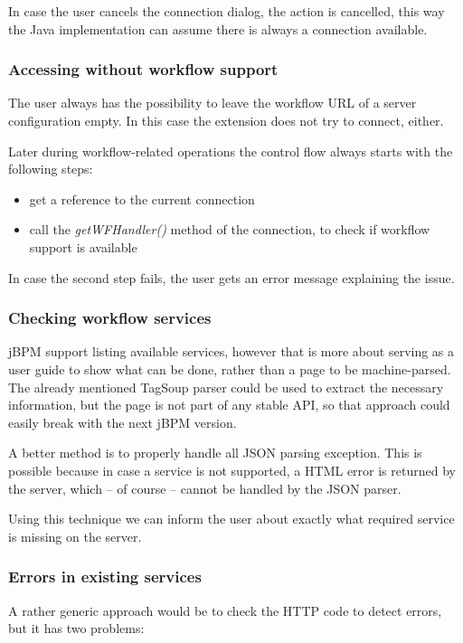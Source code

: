 In case the user cancels the connection dialog, the action is cancelled, this
way the Java implementation can assume there is always a connection available.

\subsubsection*{Accessing without workflow support}

The user always has the possibility to leave the workflow URL of a server
configuration empty. In this case the extension does not try to connect,
either.

Later during workflow-related operations the control flow always starts with the following steps:

\begin{itemize}
\item get a reference to the current connection
\item call the \emph{getWFHandler()} method of the connection, to check if workflow support is available
\end{itemize}

In case the second step fails, the user gets an error message explaining the issue.

\subsubsection*{Checking workflow services}

jBPM support listing available services, however that is more about serving as
a user guide to show what can be done, rather than a page to be machine-parsed.
The already mentioned TagSoup parser could be used to extract the necessary
information, but the page is not part of any stable API, so that approach could
easily break with the next jBPM version.

A better method is to properly handle all JSON parsing exception. This is
possible because in case a service is not supported, a HTML error is returned
by the server, which -- of course -- cannot be handled by the JSON parser.

Using this technique we can inform the user about exactly what required service
is missing on the server.

\subsubsection*{Errors in existing services}

A rather generic approach would be to check the HTTP code to detect errors, but it has two problems:

